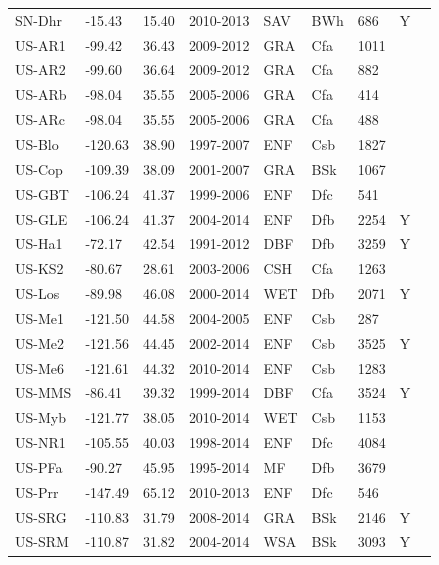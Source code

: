 \documentclass[gmd, manuscript]{copernicus}
\begin{document}
\begin{table}
\begin{tabular}{lllllllll}
  SN-Dhr & -15.43 & 15.40 & 2010-2013 & SAV & BWh & 686 & Y & \citet{SN-Dhr} \\ 
  US-AR1 & -99.42 & 36.43 & 2009-2012 & GRA & Cfa & 1011 &  & \citet{US-AR1} \\ 
  US-AR2 & -99.60 & 36.64 & 2009-2012 & GRA & Cfa & 882 &  & \citet{US-AR2} \\ 
  US-ARb & -98.04 & 35.55 & 2005-2006 & GRA & Cfa & 414 &  & \citet{US-ARb} \\ 
  US-ARc & -98.04 & 35.55 & 2005-2006 & GRA & Cfa & 488 &  & \citet{US-ARc} \\ 
  US-Blo & -120.63 & 38.90 & 1997-2007 & ENF & Csb & 1827 &  & \citet{US-Blo} \\ 
  US-Cop & -109.39 & 38.09 & 2001-2007 & GRA & BSk & 1067 &  & \citet{US-Cop} \\ 
  US-GBT & -106.24 & 41.37 & 1999-2006 & ENF & Dfc & 541 &  & \citet{US-GBT} \\ 
  US-GLE & -106.24 & 41.37 & 2004-2014 & ENF & Dfb & 2254 & Y & \citet{US-GLE} \\ 
  US-Ha1 & -72.17 & 42.54 & 1991-2012 & DBF & Dfb & 3259 & Y & \citet{US-Ha1} \\ 
  US-KS2 & -80.67 & 28.61 & 2003-2006 & CSH & Cfa & 1263 &  & \citet{US-KS2} \\ 
  US-Los & -89.98 & 46.08 & 2000-2014 & WET & Dfb & 2071 & Y & \citet{US-Los} \\ 
  US-Me1 & -121.50 & 44.58 & 2004-2005 & ENF & Csb & 287 &  & \citet{US-Me1} \\ 
  US-Me2 & -121.56 & 44.45 & 2002-2014 & ENF & Csb & 3525 & Y & \citet{US-Me2} \\ 
  US-Me6 & -121.61 & 44.32 & 2010-2014 & ENF & Csb & 1283 &  & \citet{US-Me6} \\ 
  US-MMS & -86.41 & 39.32 & 1999-2014 & DBF & Cfa & 3524 & Y & \citet{US-MMS} \\ 
  US-Myb & -121.77 & 38.05 & 2010-2014 & WET & Csb & 1153 &  & \citet{US-Myb} \\ 
  US-NR1 & -105.55 & 40.03 & 1998-2014 & ENF & Dfc & 4084 &  & \citet{US-NR1} \\ 
  US-PFa & -90.27 & 45.95 & 1995-2014 & MF & Dfb & 3679 &  & \citet{US-PFa} \\ 
  US-Prr & -147.49 & 65.12 & 2010-2013 & ENF & Dfc & 546 &  & \citet{US-Prr} \\ 
  US-SRG & -110.83 & 31.79 & 2008-2014 & GRA & BSk & 2146 & Y & \citet{US-SRG} \\ 
  US-SRM & -110.87 & 31.82 & 2004-2014 & WSA & BSk & 3093 & Y & \citet{US-SRM} \\ 

\end{tabular}
\end{table}
\end{document}

